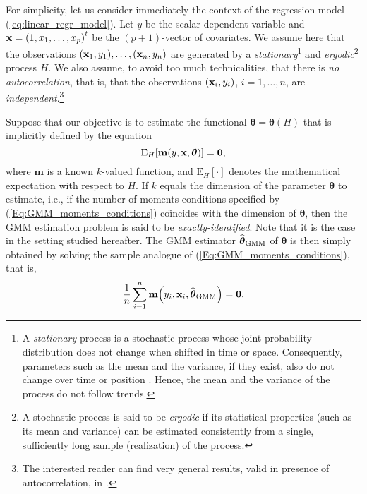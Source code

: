 For simplicity, let us consider immediately the context of the regression
model (\ref{eq:linear_regr_model}). Let $y$ be the scalar dependent variable
and $\stvec{x}=\left(  1,x_{1},\ldots,x_{p}\right)  ^{t}$ be the $\left(
p+1\right)  $-vector of covariates. We assume here that the observations
$\left(  \stvec{x}_{1},y_{1}\right)  ,\ldots,\left(  \stvec{x}_{n}%
,y_{n}\right)  $ are generated by a \emph{stationary}\footnote{A
\emph{stationary} process is a stochastic process whose joint probability
distribution does not change when shifted in time or space. Consequently,
parameters such as the mean and the variance, if they exist, also do not
change over time or position . Hence, the mean and the variance of the process
do not follow trends.} and \emph{ergodic}\footnote{A stochastic process is
said to be \emph{ergodic} if its statistical properties (such as its mean
and variance) can be estimated consistently from a single, sufficiently long
sample (realization) of the process.} process $H$. We also assume, to avoid
too much technicalities, that there is \emph{no autocorrelation}, that is,
that the observations $\left(  \stvec{x}_{i},y_{i}\right)  $, $i = 1, \dots, n$,
are \emph{independent}.\footnote{The interested reader can find very general
results, valid in presence of autocorrelation, in
\cite{Croux:2003}.}

Suppose that our objective is to estimate the functional $\boldsymbol{\theta
}=\boldsymbol{\theta}\left(  H\right)  $ that is implicitly defined by the
equation
\begin{equation}
\mathrm{E}_{H}\left[  \mathbf{m}\left(  y,\stvec{x},\boldsymbol{\theta
}\right)  \right]  =\mathbf{0}, \label{Eq:GMM_moments_conditions}%
\end{equation}
where $\mathbf{m}$ is a known $k$-valued function, and $\mathrm{E}_{H}\left[
\cdot\right]  $ denotes the mathematical expectation with respect to $H$. If
$k$ equals the dimension of the parameter $\boldsymbol{\theta}$ to estimate,
i.e., if the number of moments conditions specified by
(\ref{Eq:GMM_moments_conditions}) co\"{\i}ncides with the dimension of
$\boldsymbol{\theta}$, then the GMM estimation problem is said to be
\emph{exactly-identified}. Note that it is the case in the setting studied
hereafter. The GMM estimator $\widehat{\boldsymbol{\theta}}_{\mathrm{GMM}}$ of
$\boldsymbol{\theta}$ is then simply obtained by solving the sample analogue
of (\ref{Eq:GMM_moments_conditions}), that is,
\begin{equation}
\frac{1}{n}\sum_{i=1}^{n}\mathbf{m}\left(  y_{i},\stvec{x}_{i},\widehat
{\boldsymbol{\theta}}_{\mathrm{GMM}}\right)  =\mathbf{0}.
\label{Eq:GMM_equations}%
\end{equation}



